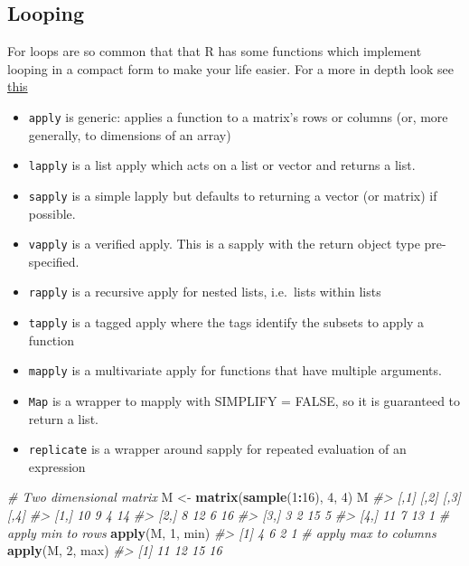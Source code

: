 \documentclass[]{book}
\newenvironment{Shaded}{\begin{snugshade}}{\end{snugshade}}
\newcommand{\KeywordTok}[1]{\textcolor[rgb]{0.13,0.29,0.53}{\textbf{#1}}}
\newcommand{\DecValTok}[1]{\textcolor[rgb]{0.00,0.00,0.81}{#1}}
\newcommand{\StringTok}[1]{\textcolor[rgb]{0.31,0.60,0.02}{#1}}
\newcommand{\CommentTok}[1]{\textcolor[rgb]{0.56,0.35,0.01}{\textit{#1}}}
\newcommand{\OperatorTok}[1]{\textcolor[rgb]{0.81,0.36,0.00}{\textbf{#1}}}
\newcommand{\NormalTok}[1]{#1}
\providecommand{\tightlist}{%
  \setlength{\itemsep}{0pt}\setlength{\parskip}{0pt}}
\theoremstyle{definition}
\theoremstyle{definition}
\theoremstyle{definition}
\theoremstyle{remark}
\begin{document}
\subsection{Looping}\label{looping}

For loops are so common that that R has some functions which implement
looping in a compact form to make your life easier. For a more in depth
look see
\href{https://bookdown.org/rdpeng/rprogdatascience/loop-functions.html}{this}

\begin{itemize}
\tightlist
\item
  \texttt{apply} is generic: applies a function to a matrix's rows or
  columns (or, more generally, to dimensions of an array)
\item
  \texttt{lapply} is a list apply which acts on a list or vector and
  returns a list.
\item
  \texttt{sapply} is a simple lapply but defaults to returning a vector
  (or matrix) if possible.
\item
  \texttt{vapply} is a verified apply. This is a sapply with the return
  object type pre-specified.
\item
  \texttt{rapply} is a recursive apply for nested lists, i.e.~lists
  within lists
\item
  \texttt{tapply} is a tagged apply where the tags identify the subsets
  to apply a function
\item
  \texttt{mapply} is a multivariate apply for functions that have
  multiple arguments.
\item
  \texttt{Map} is a wrapper to mapply with SIMPLIFY = FALSE, so it is
  guaranteed to return a list.
\item
  \texttt{replicate} is a wrapper around sapply for repeated evaluation
  of an expression
\end{itemize}

\begin{Shaded}
\begin{Highlighting}[]
\CommentTok{# Two dimensional matrix}
\NormalTok{M <-}\StringTok{ }\KeywordTok{matrix}\NormalTok{(}\KeywordTok{sample}\NormalTok{(}\DecValTok{1}\OperatorTok{:}\DecValTok{16}\NormalTok{), }\DecValTok{4}\NormalTok{, }\DecValTok{4}\NormalTok{)}
\NormalTok{M}
\CommentTok{#>      [,1] [,2] [,3] [,4]}
\CommentTok{#> [1,]   10    9    4   14}
\CommentTok{#> [2,]    8   12    6   16}
\CommentTok{#> [3,]    3    2   15    5}
\CommentTok{#> [4,]   11    7   13    1}
\CommentTok{# apply min to rows}
\KeywordTok{apply}\NormalTok{(M, }\DecValTok{1}\NormalTok{, min)}
\CommentTok{#> [1] 4 6 2 1}
\CommentTok{# apply max to columns}
\KeywordTok{apply}\NormalTok{(M, }\DecValTok{2}\NormalTok{, max)}
\CommentTok{#> [1] 11 12 15 16}
\end{Highlighting}
\end{Shaded}
\end{document}
